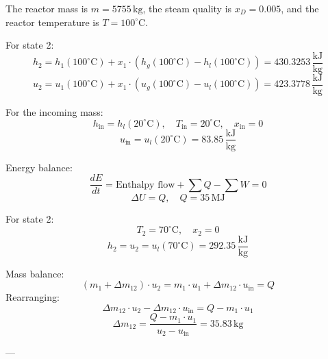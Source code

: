 The reactor mass is \( m = 5755 \, \text{kg} \), the steam quality is \( x_D = 0.005 \), and the reactor temperature is \( T = 100^\circ\text{C} \).  

For state 2:  
\[
h_2 = h_1(100^\circ\text{C}) + x_1 \cdot \left( h_g(100^\circ\text{C}) - h_l(100^\circ\text{C}) \right) = 430.3253 \, \frac{\text{kJ}}{\text{kg}}
\]  
\[
u_2 = u_1(100^\circ\text{C}) + x_1 \cdot \left( u_g(100^\circ\text{C}) - u_l(100^\circ\text{C}) \right) = 423.3778 \, \frac{\text{kJ}}{\text{kg}}
\]  

For the incoming mass:  
\[
h_{\text{in}} = h_l(20^\circ\text{C}), \quad T_{\text{in}} = 20^\circ\text{C}, \quad x_{\text{in}} = 0
\]  
\[
u_{\text{in}} = u_l(20^\circ\text{C}) = 83.85 \, \frac{\text{kJ}}{\text{kg}}
\]  

Energy balance:  
\[
\frac{dE}{dt} = \text{Enthalpy flow} + \sum Q - \sum W = 0
\]  
\[
\Delta U = Q, \quad Q = 35 \, \text{MJ}
\]  

For state 2:  
\[
T_2 = 70^\circ\text{C}, \quad x_2 = 0
\]  
\[
h_2 = u_2 = u_l(70^\circ\text{C}) = 292.35 \, \frac{\text{kJ}}{\text{kg}}
\]  

Mass balance:  
\[
(m_1 + \Delta m_{12}) \cdot u_2 = m_1 \cdot u_1 + \Delta m_{12} \cdot u_{\text{in}} = Q
\]  
Rearranging:  
\[
\Delta m_{12} \cdot u_2 - \Delta m_{12} \cdot u_{\text{in}} = Q - m_1 \cdot u_1
\]  
\[
\Delta m_{12} = \frac{Q - m_1 \cdot u_1}{u_2 - u_{\text{in}}} = 35.83 \, \text{kg}
\]  

---